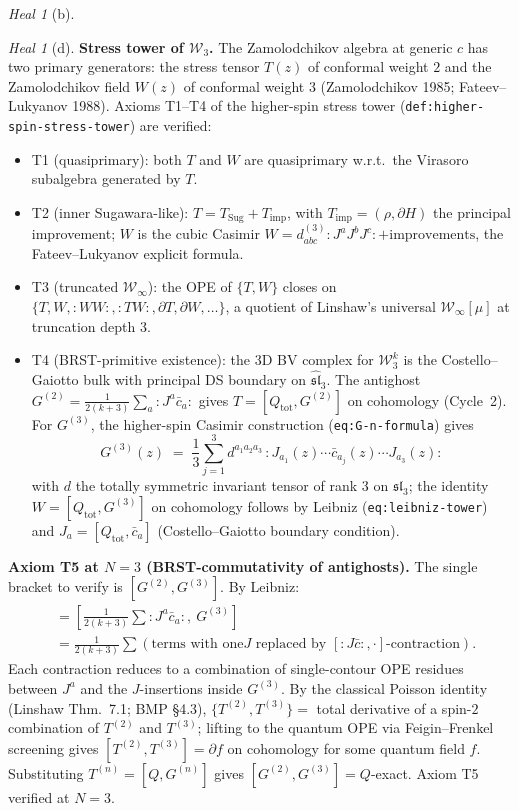 \documentclass{article}
\theoremstyle{definition}
\theoremstyle{remark}
\newtheorem{heal}[theorem]{Heal}
\newcommand{\cW}{\mathcal{W}}
\begin{document}
\begin{heal}[b]
\begin{heal}[d]
\textbf{Stress tower of $\cW_3$.} The Zamolodchikov
algebra at generic $c$ has two primary generators: the
stress tensor $T(z)$ of conformal weight $2$ and the
Zamolodchikov field $W(z)$ of conformal weight $3$
(Zamolodchikov 1985; Fateev--Lukyanov 1988). Axioms
T1--T4 of the higher-spin stress tower
(\texttt{def:higher-spin-stress-tower}) are verified:
\begin{itemize}
\item T1 (quasiprimary): both $T$ and $W$ are
quasiprimary w.r.t.\ the Virasoro subalgebra generated by
$T$.
\item T2 (inner Sugawara-like): $T = T_{\mathrm{Sug}}
+ T_{\mathrm{imp}}$, with
$T_{\mathrm{imp}} = (\rho, \partial H)$ the principal
improvement; $W$ is the cubic Casimir
$W = d_{abc}^{(3)} :J^a J^b J^c: + \text{improvements}$,
the Fateev--Lukyanov explicit formula.
\item T3 (truncated $\cW_\infty$): the OPE of $\{T, W\}$
closes on $\{T, W, :WW:, :TW:, \partial T, \partial W, \ldots\}$,
a quotient of Linshaw's universal $\cW_\infty[\mu]$ at
truncation depth 3.
\item T4 (BRST-primitive existence): the 3D BV complex for
$\cW_3^k$ is the Costello--Gaiotto bulk with principal DS
boundary on $\widehat{\mathfrak{sl}}_3$. The
antighost $G^{(2)} = \tfrac{1}{2(k+3)} \sum_a :J^a \bar c_a:$
gives $T = [Q_{\mathrm{tot}}, G^{(2)}]$ on cohomology
(Cycle~2). For $G^{(3)}$, the higher-spin
Casimir construction
(\texttt{eq:G-n-formula}) gives
\begin{equation}\label{eq:opus-G3}
  G^{(3)}(z) \;=\; \frac{1}{3} \sum_{j=1}^3
  d^{a_1 a_2 a_3}\, :J_{a_1}(z)\cdots \bar c_{a_j}(z)
  \cdots J_{a_3}(z):
\end{equation}
with $d$ the totally symmetric invariant tensor of rank 3 on
$\mathfrak{sl}_3$; the identity $W = [Q_{\mathrm{tot}},
G^{(3)}]$ on cohomology follows by Leibniz
(\texttt{eq:leibniz-tower}) and
$J_a = [Q_{\mathrm{tot}}, \bar c_a]$
(Costello--Gaiotto boundary condition).
\end{itemize}

\textbf{Axiom T5 at $N=3$ (BRST-commutativity of
antighosts).} The single bracket to verify is
$[G^{(2)}, G^{(3)}]$. By Leibniz:
\begin{align*}
  [G^{(2)}, G^{(3)}]
  &= \left[\tfrac{1}{2(k+3)}\sum :J^a \bar c_a:,\ G^{(3)}\right] \\
  &= \tfrac{1}{2(k+3)} \sum \left(\text{terms with one
$J$ replaced by $[:J\bar c:, \cdot]$-contraction}\right).
\end{align*}
Each contraction reduces to a combination of single-contour
OPE residues between $J^a$ and the $J$-insertions inside
$G^{(3)}$. By the classical Poisson identity (Linshaw
Thm.~7.1; BMP \S4.3), $\{T^{(2)}, T^{(3)}\} =$ total
derivative of a spin-$2$ combination of $T^{(2)}$ and
$T^{(3)}$; lifting to the quantum OPE via
Feigin--Frenkel screening gives
$[T^{(2)}, T^{(3)}] = \partial f$ on cohomology for some
quantum field $f$. Substituting $T^{(n)} = [Q,G^{(n)}]$ gives
$[G^{(2)}, G^{(3)}] = Q$-exact. Axiom T5 verified at $N=3$.


\end{heal}
\end{heal}
\end{document}
